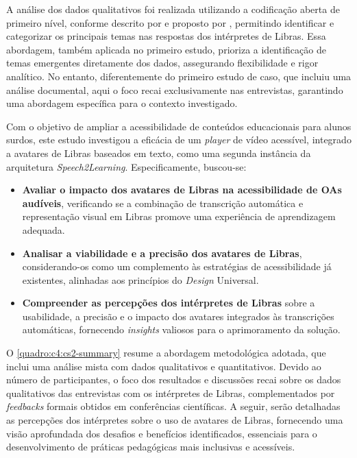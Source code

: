 A análise dos dados qualitativos foi realizada utilizando a codificação aberta de primeiro nível, conforme descrito por  e proposto por , permitindo identificar e categorizar os principais temas nas respostas dos intérpretes de Libras. Essa abordagem, também aplicada no primeiro estudo, prioriza a identificação de temas emergentes diretamente dos dados, assegurando flexibilidade e rigor analítico. No entanto, diferentemente do primeiro estudo de caso, que incluiu uma análise documental, aqui o foco recai exclusivamente nas entrevistas, garantindo uma abordagem específica para o contexto investigado.

Com o objetivo de ampliar a acessibilidade de conteúdos educacionais para alunos surdos, este estudo investigou a eficácia de um \textit{player} de vídeo acessível, integrado a avatares de Libras baseados em texto, como uma segunda instância da arquitetura \textit{Speech2Learning}. Especificamente, buscou-se:

\begin{itemize}
\item \textbf{Avaliar o impacto dos avatares de Libras na acessibilidade de OAs audíveis}, verificando se a combinação de transcrição automática e representação visual em Libras promove uma experiência de aprendizagem adequada.
\item \textbf{Analisar a viabilidade e a precisão dos avatares de Libras}, considerando-os como um complemento às estratégias de acessibilidade já existentes, alinhadas aos princípios do \textit{Design} Universal.
\item \textbf{Compreender as percepções dos intérpretes de Libras} sobre a usabilidade, a precisão e o impacto dos avatares integrados às transcrições automáticas, fornecendo \textit{insights} valiosos para o aprimoramento da solução.
\end{itemize}

O \autoref{quadro:c4:cs2-summary} resume a abordagem metodológica adotada, que inclui uma análise mista com dados qualitativos e quantitativos. Devido ao número de participantes, o foco dos resultados e discussões recai sobre os dados qualitativos das entrevistas com os intérpretes de Libras, complementados por \textit{feedbacks} formais obtidos em conferências científicas. A seguir, serão detalhadas as percepções dos intérpretes sobre o uso de avatares de Libras, fornecendo uma visão aprofundada dos desafios e benefícios identificados, essenciais para o desenvolvimento de práticas pedagógicas mais inclusivas e acessíveis.

